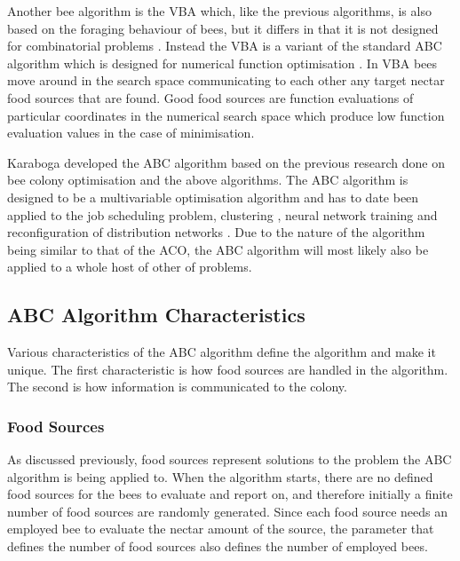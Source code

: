 Another bee algorithm is the \gls{VBA} which, like the previous algorithms, is also based on the foraging behaviour of bees, but it differs in that it is not designed for combinatorial problems \cite{ABCNumericalOptimization}. Instead the \gls{VBA} is a variant of the standard \gls{ABC} algorithm which is designed for numerical function optimisation \cite{ABCNumericalOptimization}. In \gls{VBA} bees move around in the search space communicating to each other any target nectar food sources that are found\cite{ABCNumericalOptimization}. Good food sources are function evaluations of particular coordinates in the numerical search space which produce low function evaluation values in the case of minimisation\cite{ABCNumericalOptimization}.

Karaboga developed the \gls{ABC} algorithm based on the previous research done on bee colony optimisation and the above algorithms. The \gls{ABC} algorithm is designed to be a multivariable optimisation algorithm and has to date been applied to the job scheduling problem, clustering \cite{HybridABCClustering}, neural network training and reconfiguration of distribution networks \cite{ABCReconfigDistro}. Due to the nature of the algorithm being similar to that of the \gls{ACO}, the \gls{ABC} algorithm will most likely also be applied to a whole host of other of problems.

\subsection{ABC Algorithm Characteristics}
Various characteristics of the \gls{ABC} algorithm define the algorithm and make it unique. The first characteristic is how food sources are handled in the algorithm. The second is how information is communicated to the colony.
\subsubsection{Food Sources}
\label{sec:foodsources}
As discussed previously, food sources represent solutions to the problem the \gls{ABC} algorithm is being applied to. When the algorithm starts, there are no defined food sources for the bees to evaluate and report on, and therefore initially a finite number of food sources are randomly generated\cite{ABCCompareStudy,ABCFusionGrid}. Since each food source needs an employed bee to evaluate the nectar amount of the source, the parameter that defines the number of food sources also defines the number of employed bees\cite{ABCCompareStudy,ABCLeafConstrained}.

